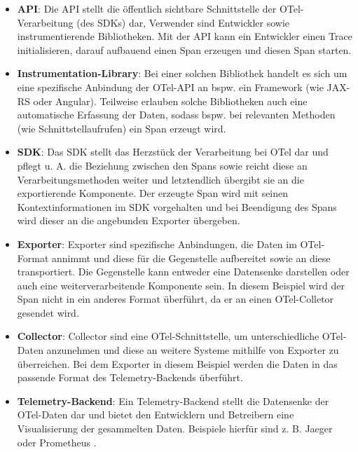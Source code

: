 \begin{itemize}
	\item \textbf{API}: Die API stellt die öffentlich sichtbare Schnittstelle der OTel-Verarbeitung (des SDKs) dar, Verwender sind Entwickler sowie instrumentierende Bibliotheken. Mit der API kann ein Entwickler einen Trace initialisieren, darauf aufbauend einen Span erzeugen und diesen Span starten.
	\item \textbf{Instrumentation-Library}: Bei einer solchen Bibliothek handelt es sich um eine spezifische Anbindung der OTel-API an bspw. ein Framework (wie JAX-RS oder Angular). Teilweise erlauben solche Bibliotheken auch eine automatische Erfassung der Daten, sodass bspw. bei relevanten Methoden (wie Schnittstellaufrufen) ein Span erzeugt wird.
	\item \textbf{SDK}: Das SDK stellt das Herzstück der Verarbeitung bei OTel dar und pflegt u. A. die Beziehung zwischen den Spans sowie reicht diese an Verarbeitungsmethoden weiter und letztendlich übergibt sie an die exportierende Komponente. Der erzeugte Span wird mit seinen Kontextinformationen im SDK vorgehalten und bei Beendigung des Spans wird dieser an die angebunden Exporter übergeben.
	\item \textbf{Exporter}: Exporter sind spezifische Anbindungen, die Daten im OTel-Format annimmt und diese für die Gegenstelle aufbereitet sowie an diese transportiert. Die Gegenstelle kann entweder eine Datensenke darstellen oder auch eine weiterverarbeitende Komponente sein. In diesem Beispiel wird der Span nicht in ein anderes Format überführt, da er an einen OTel-Colletor gesendet wird.
	\item \textbf{Collector}: Collector sind eine OTel-Schnittstelle, um unterschiedliche OTel-Daten anzunehmen und diese an weitere Systeme mithilfe von Exporter zu überreichen. Bei dem Exporter in diesem Beispiel werden die Daten in das passende Format des Telemetry-Backends überführt.
	\item \textbf{Telemetry-Backend}: Ein Telemetry-Backend stellt die Datensenke der OTel-Daten dar und bietet den Entwicklern und Betreibern eine Visualisierung der gesammelten Daten. Beispiele hierfür sind z. B. Jaeger \cite{Jaeger} oder Prometheus \cite{Prometheus}.
\end{itemize}
 
